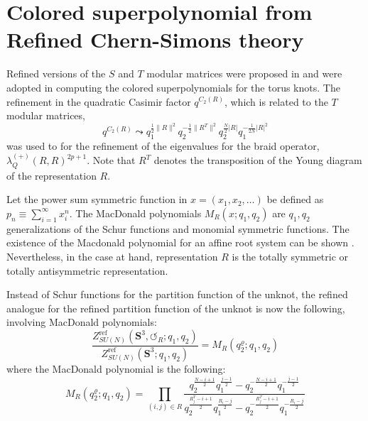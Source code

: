 \documentclass[a4paper,titlepage,twoside]{book}
\begin{document}
\section{Colored superpolynomial from Refined Chern-Simons theory}


Refined versions of the $S$ and $T$ modular matrices were proposed in \cite{AganagicShakirov2012} and were adopted in computing the colored superpolynomials for the torus knots.  The refinement in the quadratic Casimir factor $q^{C_2{(R)}}$, which is related to the $T$ modular matrices,
\begin{equation}
  q^{C_2{(R)}} \leadsto q_1^{ \frac{1}{2} \| R\|^2} q_2^{ -\frac{1}{2} \| R^T\|^2} q_2^{ \frac{N}{2} |R| } q_1^{-\frac{1}{2N} |R|^2 }
\end{equation}
was used to for the refinement of the eigenvalues for the braid operator, $\lambda^{(+)}_Q{(R,R)}^{2p+1}$.  Note that $R^T$ denotes the transposition of the Young diagram of the representation $R$.  

Let the power sum symmetric function in $x = (x_1, x_2, \dots)$ be defined as $p_n \equiv \sum_{i=1}^{\infty} x_i^n$.  The MacDonald polynomials $M_R(x;q_1,q_2)$ are $q_1,q_2$ generalizations of the Schur functions and monomial symmetric functions.  The existence of the Macdonald polynomial for an affine root system can be shown \cite{Warnaar}.  Nevertheless, in the case at hand, representation $R$ is the totally symmetric or totally antisymmetric representation.

Instead of Schur functions for the partition function of the unknot, the refined analogue for the refined partition function of the unknot is now the following, involving MacDonald polynomials:
\begin{equation}
  \frac{ Z^{ \text{ref} }_{SU(N)}(\mathbf{S}^3, \circlearrowleft_R; q_1, q_2) }{ Z^{ \text{ref} }_{SU(N)}{ (\mathbf{S}^3; q_1, q_2 ) } } = M_R{ (q_2^{ \varrho}; q_1,q_2) }
\end{equation}
where the MacDonald polynomial is the following:
\begin{equation}
  M_R{ (q_2^{\varrho}; q_1, q_2) } = \prod_{ (i,j) \in R }  \frac{q_2^{  \frac{ N- i + 1}{2} } q_1^{ \frac{j-1}{2} } - q_2^{ - \frac{N-i + 1}{2} } q_1^{ - \frac{j-1}{2} } }{  q_2^{ \frac{R_j^T - i + 1 }{2} } q_1^{ \frac{R_i - j}{2} } - q_2^{ - \frac{ R_j^T - i + 1 }{2} } q_1^{ - \frac{R_i - j }{2} } }
\end{equation}
\end{document}
